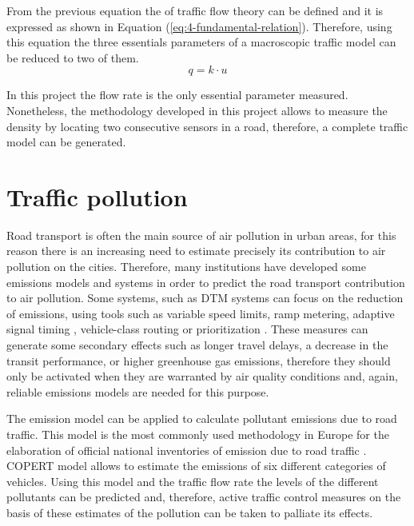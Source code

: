 From the previous equation the  of traffic flow theory can be defined and it is expressed as shown in Equation (\ref{eq:4-fundamental-relation}). Therefore, using this equation the three essentials parameters of a macroscopic traffic model can be reduced to two of them.
\begin{equation} \label{eq:4-fundamental-relation}
q = k \cdot u
\end{equation}

In this project the flow rate is the only essential parameter measured. Nonetheless, the methodology developed in this project allows to measure the density by locating two consecutive sensors in a road, therefore, a complete traffic model can be generated.


\section{Traffic pollution}

Road transport is often the main source of air pollution in urban areas, for this reason there is an increasing need to estimate precisely its contribution to air pollution on the cities. Therefore, many institutions have developed some emissions models and systems in order to predict the road transport contribution to air pollution. Some systems, such as \ac{DTM} systems can focus on the reduction of emissions, using tools such as variable speed limits, ramp metering, adaptive signal timing \cite{MK10}, vehicle-class routing or prioritization \cite{ZDHB09}. These measures can generate some secondary effects such as longer travel delays, a decrease in the transit performance, or higher greenhouse gas emissions, therefore they should only be activated when they are warranted by air quality conditions \cite{EMA09} and, again, reliable emissions models are needed for this purpose. 

The  emission model \cite{NS16} can be applied to calculate pollutant emissions due to road traffic. This model is the most commonly used methodology in Europe for the elaboration of official national inventories of emission due to road traffic \cite{Zaldei2017531}. COPERT model allows to estimate the emissions of six different categories of vehicles. Using this model and the traffic flow rate the levels of the different pollutants can be predicted and, therefore, active traffic control measures on the basis of these estimates of the pollution can be taken to palliate its effects.

